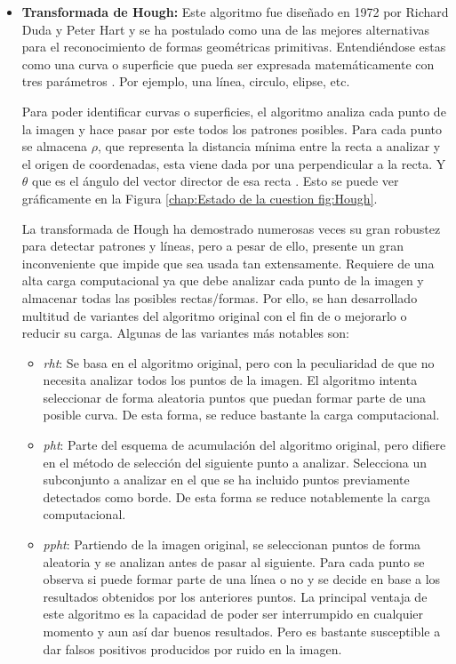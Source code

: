 \begin{itemize}
\item \textbf{Transformada de Hough:} Este algoritmo fue diseñado en 1972 por Richard Duda y Peter Hart \cite{hough} y se ha postulado como una de las mejores alternativas para el reconocimiento de formas geométricas primitivas. Entendiéndose estas como una curva o superficie que pueda ser expresada matemáticamente con tres parámetros \cite{hough}. Por ejemplo, una línea, circulo, elipse, etc.

Para poder identificar curvas o superficies, el algoritmo analiza cada punto de la imagen y hace pasar por este todos los patrones posibles. Para cada punto se almacena $\rho$, que representa la distancia mínima entre la recta a analizar y el origen de coordenadas, esta viene dada por una perpendicular a la recta. Y $\theta$ que es el ángulo del vector director de esa recta \cite{hough2}. Esto se puede ver gráficamente en la Figura \ref{chap:Estado de la cuestion fig:Hough}.

La transformada de Hough ha demostrado numerosas veces su gran robustez para detectar patrones y líneas, pero a pesar de ello, presente un gran inconveniente que impide que sea usada tan extensamente. Requiere de una alta carga computacional ya que debe analizar cada punto de la imagen y almacenar todas las posibles rectas/formas. Por ello, se han desarrollado multitud de variantes del algoritmo original con el fin de o mejorarlo o reducir su carga. Algunas de las variantes más notables son:

\begin{itemize}
\item \textit{\ac{rht}}: Se basa en el algoritmo original, pero con la peculiaridad de que no necesita analizar todos los puntos de la imagen. El algoritmo intenta seleccionar de forma aleatoria puntos que puedan formar parte de una posible curva. De esta forma, se reduce bastante la carga computacional.
	
\item \textit{\ac{pht}}: Parte del esquema de acumulación del algoritmo original, pero difiere en el método de selección del siguiente punto a analizar. Selecciona un subconjunto a analizar en el que se ha incluido puntos previamente detectados como borde. De esta forma se reduce notablemente la carga computacional.
		
\item \textit{\ac{ppht}}: Partiendo de la imagen original, se seleccionan puntos de forma aleatoria y se analizan antes de pasar al siguiente. Para cada punto se observa si puede formar parte de una línea o no y se decide en base a los resultados obtenidos por los anteriores puntos. La principal ventaja de este algoritmo es la capacidad de poder ser interrumpido en cualquier momento y aun así dar buenos resultados. Pero es bastante susceptible a dar falsos positivos producidos por ruido en la imagen.
\end{itemize}

\end{itemize}

